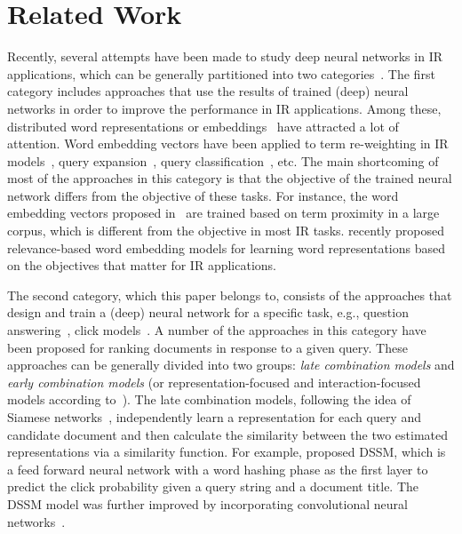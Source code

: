 \section{Related Work}

Recently, several attempts have been made to study deep neural networks in IR applications, which can be generally partitioned into two categories~\citep{Onal:2016, Zhang:2016}. 
The first category includes approaches that use the results of trained (deep) neural networks in order to improve the performance in IR applications. Among these, distributed word representations or embeddings~\citep{Mikolov:2013,Pennington:2014} have attracted a lot of attention. Word embedding vectors have been applied to term re-weighting in IR models~\citep{Zheng:2015}, query expansion~\citep{Diaz:2016,Zamani:2016a}, query classification~\citep{Liu:2015,Zamani:2016b},  etc. 
The main shortcoming of most of the approaches in this category is that the objective of the trained neural network differs from the objective of these tasks.  For instance, the word embedding vectors proposed in~\citep{Mikolov:2013,Pennington:2014} are trained based on term proximity in a large corpus, which is different from the objective in most IR tasks. \citet{Zamani:2017} recently proposed relevance-based word embedding models for learning word representations based on the objectives that matter for IR applications.

The second category, which this paper belongs to, consists of the approaches that design and train a (deep) neural network for a specific task, e.g., question answering~\citep{Cohen:2016,Yang:2016}, click models~\citep{Borisov:2016}.
A number of the approaches in this category have been proposed for ranking documents in response to a given query.
These approaches can be generally divided into two groups: \emph{late combination models} and \emph{early combination models} (or representation-focused and interaction-focused models according to~\citep{Guo:2016}). 
The late combination models, following the idea of Siamese networks~\citep{Bromley:1993}, independently learn a representation for each query and candidate document and then calculate the similarity between the two estimated representations via a similarity function. For example, \citet{Huang:2013} proposed DSSM, which is a feed forward neural network with a word hashing phase as the first layer to predict the click probability given a query string and a document title. 
The DSSM model was further improved by incorporating convolutional neural networks~\citep{Shen:2014}.

